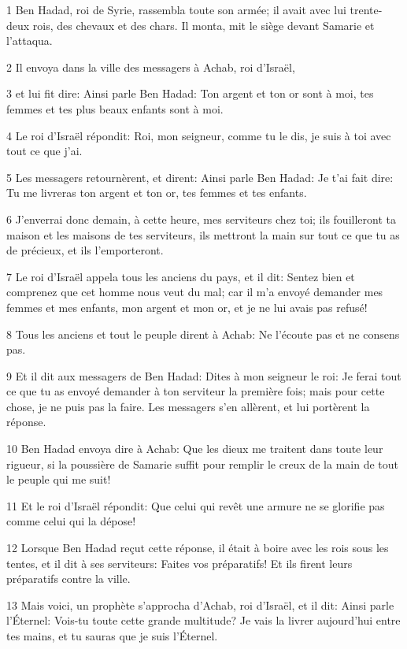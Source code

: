 \par 1 Ben Hadad, roi de Syrie, rassembla toute son armée; il avait avec lui trente-deux rois, des chevaux et des chars. Il monta, mit le siège devant Samarie et l'attaqua.
\par 2 Il envoya dans la ville des messagers à Achab, roi d'Israël,
\par 3 et lui fit dire: Ainsi parle Ben Hadad: Ton argent et ton or sont à moi, tes femmes et tes plus beaux enfants sont à moi.
\par 4 Le roi d'Israël répondit: Roi, mon seigneur, comme tu le dis, je suis à toi avec tout ce que j'ai.
\par 5 Les messagers retournèrent, et dirent: Ainsi parle Ben Hadad: Je t'ai fait dire: Tu me livreras ton argent et ton or, tes femmes et tes enfants.
\par 6 J'enverrai donc demain, à cette heure, mes serviteurs chez toi; ils fouilleront ta maison et les maisons de tes serviteurs, ils mettront la main sur tout ce que tu as de précieux, et ils l'emporteront.
\par 7 Le roi d'Israël appela tous les anciens du pays, et il dit: Sentez bien et comprenez que cet homme nous veut du mal; car il m'a envoyé demander mes femmes et mes enfants, mon argent et mon or, et je ne lui avais pas refusé!
\par 8 Tous les anciens et tout le peuple dirent à Achab: Ne l'écoute pas et ne consens pas.
\par 9 Et il dit aux messagers de Ben Hadad: Dites à mon seigneur le roi: Je ferai tout ce que tu as envoyé demander à ton serviteur la première fois; mais pour cette chose, je ne puis pas la faire. Les messagers s'en allèrent, et lui portèrent la réponse.
\par 10 Ben Hadad envoya dire à Achab: Que les dieux me traitent dans toute leur rigueur, si la poussière de Samarie suffit pour remplir le creux de la main de tout le peuple qui me suit!
\par 11 Et le roi d'Israël répondit: Que celui qui revêt une armure ne se glorifie pas comme celui qui la dépose!
\par 12 Lorsque Ben Hadad reçut cette réponse, il était à boire avec les rois sous les tentes, et il dit à ses serviteurs: Faites vos préparatifs! Et ils firent leurs préparatifs contre la ville.
\par 13 Mais voici, un prophète s'approcha d'Achab, roi d'Israël, et il dit: Ainsi parle l'Éternel: Vois-tu toute cette grande multitude? Je vais la livrer aujourd'hui entre tes mains, et tu sauras que je suis l'Éternel.
